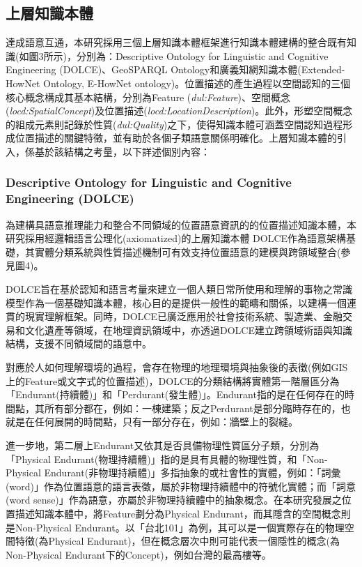 \subsection{上層知識本體}

達成語意互通，本研究採用三個上層知識本體框架進行知識本體建構的整合既有知識(如圖3所示)，分別為：Descriptive Ontology for Linguistic and Cognitive Engineering (DOLCE)、GeoSPARQL Ontology和廣義知網知識本體(Extended-HowNet Ontology, E-HowNet ontology)。位置描述的產生過程以空間認知的三個核心概念構成其基本結構，分別為Feature (\textit{dul:Feature})、空間概念(\textit{locd:SpatialConcept})及位置描述(\textit{locd:LocationDescription})。此外，形塑空間概念的組成元素則記錄於性質(\textit{dul:Quality})之下，使得知識本體可涵蓋空間認知過程形成位置描述的關鍵特徵，並有助於各個子類語意關係明確化。上層知識本體的引入，係基於該結構之考量，以下詳述個別內容：

\subsubsection{Descriptive Ontology for Linguistic and Cognitive Engineering (DOLCE)}

為建構具語意推理能力和整合不同領域的位置語意資訊的的位置描述知識本體，本研究採用經邏輯語言公理化(axiomatized)的上層知識本體 DOLCE作為語意架構基礎，其實體分類系統與性質描述機制可有效支持位置語意的建模與跨領域整合(參見圖4)。

DOLCE旨在基於認知和語言考量來建立一個人類日常所使用和理解的事物之常識模型作為一個基礎知識本體，核心目的是提供一般性的範疇和關係，以建構一個連貫的現實理解框架\citep{RN86}。同時，DOLCE已廣泛應用於社會技術系統、製造業、金融交易和文化遺產等領域，在地理資訊領域中，亦透過DOLCE建立跨領域術語與知識結構，支援不同領域間的語意中\citep{RN195, RN193}。

對應於人如何理解環境的過程，會存在物理的地理環境與抽象後的表徵(例如GIS上的Feature或文字式的位置描述)，DOLCE的分類結構將實體第一階層區分為「Endurant(持續體)」和「Perdurant(發生體)」。Endurant指的是在任何存在的時間點，其所有部分都在，例如：一棟建築；反之Perdurant是部分臨時存在的，也就是在任何展開的時間點，只有一部分存在，例如：牆壁上的裂縫。

進一步地，第二層上Endurant又依其是否具備物理性質區分子類，分別為「Physical Endurant(物理持續體)」指的是具有具體的物理性質，和「Non-Physical Endurant(非物理持續體)」多指抽象的或社會性的實體，例如：「詞彙(word)」作為位置語意的語言表徵，屬於非物理持續體中的符號化實體；而「詞意(word sense)」作為語意，亦屬於非物理持續體中的抽象概念。在本研究發展之位置描述知識本體中，將Feature劃分為Physical Endurant，而其隱含的空間概念則是Non-Physical Endurant。以「台北101」為例，其可以是一個實際存在的物理空間特徵(為Physical Endurant)，但在概念層次中則可能代表一個隱性的概念(為Non-Physical Endurant下的Concept)，例如台灣的最高樓等。

